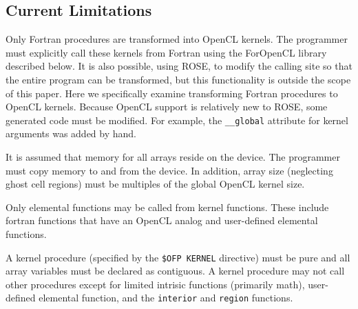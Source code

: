 \subsection{Current Limitations}

Only Fortran procedures are transformed into OpenCL kernels.  The programmer
must explicitly call these kernels from Fortran using the ForOpenCL
library described below.  It is also possible, using ROSE, to modify the calling
site so that the entire program can be transformed, but this functionality is
outside the scope of this paper.  Here we specifically examine transforming
Fortran procedures to OpenCL kernels.  Because OpenCL support is relatively
new to ROSE, some generated code must be modified.  For example, the
{\tt \_\_global} attribute for kernel arguments was added by hand.

It is assumed that memory for all arrays reside on the device.  The programmer must
copy memory to and from the device.  In addition, array size (neglecting ghost cell
regions) must be multiples of the global OpenCL kernel size.

Only elemental functions may be called from kernel functions.  These include
fortran functions that have an OpenCL analog and user-defined elemental functions.

A kernel procedure (specified by the {\tt \!\$OFP KERNEL} directive) must be
pure and all array variables must be declared as contiguous.  A kernel
procedure may not call other procedures except for limited intrisic
functions (primarily math), user-defined elemental function, and the
{\tt interior} and {\tt region} functions.
